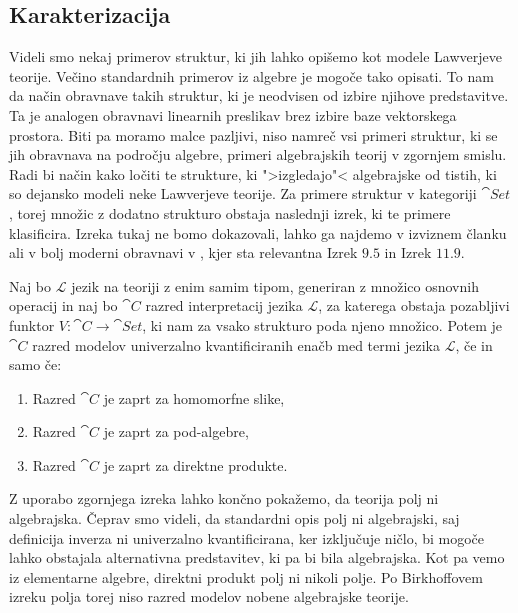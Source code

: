 \documentclass[../kategoricna_logika.tex]{subfiles}
\begin{document}
\subsection{Karakterizacija}
\label{subsec:karakterizacija-lawverjevih-teorij}
%
%
Videli smo nekaj primerov struktur, ki jih lahko opišemo kot modele
Lawverjeve teorije. Večino standardnih primerov iz algebre je mogoče
tako opisati. To nam da način obravnave takih struktur,
ki je neodvisen od izbire njihove predstavitve.
Ta je analogen obravnavi linearnih preslikav brez izbire baze vektorskega
prostora. Biti pa moramo malce pazljivi, niso namreč
vsi primeri struktur, ki se jih obravnava na področju algebre, primeri
algebrajskih teorij v zgornjem smislu. Radi bi način kako ločiti te
strukture, ki ">izgledajo"< algebrajske od tistih, ki so dejansko
modeli neke Lawverjeve teorije. Za primere struktur v kategoriji $\cat{Set}$,
torej množic z dodatno strukturo obstaja naslednji izrek, ki te
primere klasificira. Izreka tukaj ne bomo dokazovali, lahko ga najdemo v
izviznem članku \cite{birkhoff_1935} ali v bolj moderni obravnavi v \cite{cohn1981universal},
kjer sta relevantna Izrek $9.5$ in Izrek $11.9$.
\begin{izrek}\label{izrek:Birkhoff-HSP}
  Naj bo $\mathcal{L}$ jezik na teoriji z enim samim tipom, generiran z množico
  osnovnih operacij in naj bo $\cat{C}$ razred interpretacij jezika $\mathcal{L}$,
  za katerega obstaja pozabljivi funktor $V : \cat{C} \to \cat{Set}$, ki nam za
  vsako strukturo poda njeno množico. Potem je $\cat{C}$ razred modelov
  univerzalno kvantificiranih enačb med termi jezika $\mathcal{L}$, če
  in samo če:
  \begin{enumerate}
  \item Razred $\cat{C}$ je zaprt za homomorfne slike,
  \item Razred $\cat{C}$ je zaprt za pod-algebre, 
  \item Razred $\cat{C}$ je zaprt za direktne produkte.
  \end{enumerate}
\end{izrek}
%
\begin{primer}
  Z uporabo zgornjega izreka lahko končno pokažemo, da teorija polj ni algebrajska.
  Čeprav smo videli, da standardni opis polj ni algebrajski, saj definicija inverza
  ni univerzalno kvantificirana, ker izključuje ničlo, bi mogoče lahko obstajala
  alternativna predstavitev, ki pa bi bila algebrajska. Kot pa vemo iz elementarne
  algebre, direktni produkt polj ni nikoli polje. Po Birkhoffovem izreku polja
  torej niso razred modelov nobene algebrajske teorije.
\end{primer}
\end{document}
